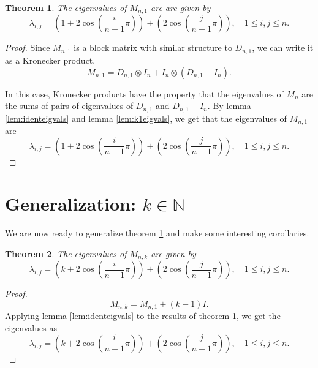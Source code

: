 \documentclass[12pt]{article}
\newtheorem{theorem}{Theorem}
\newcommand{\N}{\mathbb{N}}
\begin{document}
	\begin{theorem}\label{thm:k1eigvals}
		The eigenvalues of $M_{n,1}$ are are given by
		\begin{equation*}
		\lambda_{i,j} =
		\left(1+2\cos{\left(\frac{i}{n+1}\pi\right)}\right)+\left(2\cos{\left(\frac{j}{n+1}\pi\right)}\right),
		\hspace{12pt} 1 \leq i,j \leq n.
		\end{equation*}
	\end{theorem}
	\begin{proof}
		Since $M_{n,1}$ is a block matrix with similar structure to $D_{n,1}$, we can
		write it as a Kronecker product.
		\begin{equation*}
		M_{n,1} = D_{n,1} \otimes I_n + I_n \otimes (D_{n,1} - I_n).
		\end{equation*}
		
		In this case, Kronecker products have the property that the eigenvalues of
		$M_n$ are the sums of pairs of eigenvalues of $D_{n,1}$ and $D_{n,1} - I_n$. 
		By lemma \ref{lem:identeigvals} and lemma \ref{lem:k1eigvals}, we get that the
		eigenvalues of $M_{n,1}$ are
		\begin{equation*}
		\lambda_{i,j} =
		\left(1+2\cos{\left(\frac{i}{n+1}\pi\right)}\right)+\left(2\cos{\left(\frac{j}{n+1}\pi\right)}\right),
		\hspace{12pt} 1 \leq i,j \leq n.
		\end{equation*}
	\end{proof}
	
	\section{Generalization: $k \in \N$}
	We are now ready to generalize theorem \ref{thm:k1eigvals} and make some
	interesting corollaries.
	\begin{theorem}\label{thm:kanyeigvals}
		The eigenvalues of $M_{n,k}$ are given by
		\begin{equation*}
		\lambda_{i,j} =
		\left(k+2\cos{\left(\frac{i}{n+1}\pi\right)}\right)+\left(2\cos{\left(\frac{j}{n+1}\pi\right)}\right),
		\hspace{12pt} 1 \leq i,j \leq n.
		\end{equation*}
	\end{theorem}
	\begin{proof}
		\begin{equation*}
		M_{n,k} = M_{n,1} + (k-1)I.
		\end{equation*}
		Applying lemma \ref{lem:identeigvals} to the results of theorem
		\ref{thm:k1eigvals}, we get the eigenvalues as
		\begin{equation}\label{eq:kmanyeigvals}
		\lambda_{i,j} =
		\left(k+2\cos{\left(\frac{i}{n+1}\pi\right)}\right)+\left(2\cos{\left(\frac{j}{n+1}\pi\right)}\right),
		\hspace{12pt} 1 \leq i,j \leq n.
		\end{equation}
	\end{proof}
	
\end{document}
